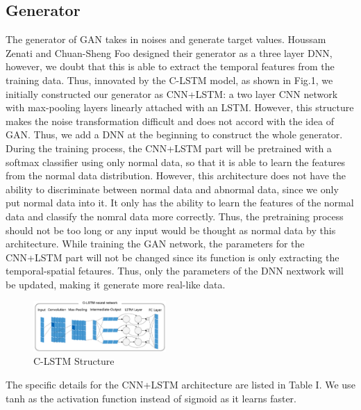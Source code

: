 \documentclass{acmtog} %
\begin{document}
\subsection{Generator}
The generator of GAN takes in noises and generate target values. Houssam Zenati and Chuan-Sheng Foo designed their generator as a three layer DNN, however, we doubt that this is able to extract the temporal features from the training data. Thus, innovated by the C-LSTM model, as shown in Fig.1, we initially constructed our generator as CNN+LSTM: a two layer CNN network with max-pooling layers linearly attached with an LSTM. However, this structure makes the noise transformation difficult and does not accord with the idea of GAN. Thus, we add a DNN at the beginning to construct the whole generator. During the training process, the CNN+LSTM part will be pretrained with a softmax classifier using only normal data, so that it is able to learn the features from the normal data distribution. However, this architecture does not have the ability to discriminate between normal data and abnormal data, since we only put normal data into it. It only has the ability to learn the features of the normal data and classify the nomral data more correctly. Thus, the pretraining process should not be too long or any input would be thought as normal data by this architecture. While training the GAN network, the parameters for the CNN+LSTM part will not be changed since its function is only extracting the temporal-spatial fetaures. Thus, only the parameters of the DNN nextwork will be updated, making it generate more real-like data.

\begin{figure}[h]
   \begin{center}
      \includegraphics[width=0.45\textwidth]{C-LSTM.png}
   \end{center}
\caption{C-LSTM Structure}
\label{RTL}
\end{figure}

The specific details for the CNN+LSTM architecture are listed in Table I. We use tanh as the activation function instead of sigmoid as it learns faster. 
\end{document}
